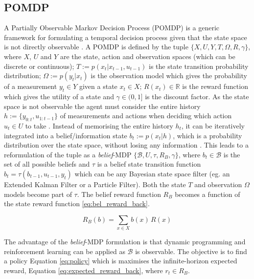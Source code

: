 \documentclass[final,5p,times,twocolumn]{elsarticle}
\begin{document}
\subsection{POMDP}

A Partially Observable Markov Decision Process (POMDP) is a generic framework for formulating a temporal decision process 
given that the state space is not directly observable \cite{Sondik_1973}. A POMDP is defined by the tuple $\{X,U,Y,T,\Omega,R,\gamma\}$, 
where $X$, $U$ and $Y$ are the state, action and observation spaces (which can be discrete or continuous);
${T:= p(x_t|x_{t-1},u_{t-1})}$ is the state transition probability distribution; $\Omega := p(y_t|x_t)$ is 
the observation model which gives the probability of a measurement $y_t \in Y$ given a state $x_t \in X$; 
$R(x_t) \in \mathbb{R}$ is the reward function which gives the utility of a state and $\gamma \in (0,1]$ is the discount factor. As the state space is not 
observable the agent must consider the entire history $h := \{y_{0:t},u_{1:t-1}\}$ of measurements and actions
when deciding which action $u_t \in U$ to take \cite{Ross08onlineplanning}. Instead of memorising the entire history $h_t$, 
it can be iteratively integrated into a belief/information state ${b_t := p(x_t|h)}$, which 
is a probability distribution over the state space, without losing any information \cite{Milos_POMDP_2000}.
This leads to a reformulation of the tuple as a \textit{belief}-MDP $\{\mathcal{B},U,\tau,R_B,\gamma\}$, where $b_t \in \mathcal{B}$ is 
the set of all possible beliefs and $\tau$ is a belief state transition function $b_t = \tau(b_{t-1},u_{t-1},y_t)$ 
which can be any Bayesian state space filter (eg. an Extended Kalman Filter or a Particle Filter). Both the state $T$ and observation 
$\Omega$ models become part of $\tau$. The belief reward function $R_B$ becomes a function of the state reward function \ref{eq:bel_reward_back}. 

\begin{equation}\label{eq:bel_reward_back}
  R_B(b) = \sum\limits_{x \in X} b(x)\, R(x)
\end{equation}

The advantage of the \textit{belief}-MDP formulation is that dynamic programming and reinforcement
learning can be applied as $\mathcal{B}$ is observable.  The objective is to find a 
policy Equation \ref{eq:policy} which is maximises the infinite-horizon expected reward, Equation 
\ref{eq:expected_reward_back}, where $r_t \in R_B$. 
\end{document}
